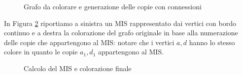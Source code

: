 \documentclass{article}
\begin{document}
\begin{figure}
\caption{Grafo da colorare e generazione delle copie con connessioni}
\label{figura:original-graph-and-reduce-ready-graph}
\end{figure}

In Figura \ref{figura:MIS-coloring} riportiamo a sinistra un MIS
rappresentato dai vertici con bordo continuo e a destra la colorazione 
del grafo originale in base alla numerazione delle copie che appartengono
al MIS: notare che i vertici $a,d$ hanno lo stesso colore in quanto le copie
$a_1, d_1$ appartengono al MIS.
\begin{figure}
\caption{Calcolo del MIS e colorazione finale}
\label{figura:MIS-coloring}
\end{figure}
\end{document}
